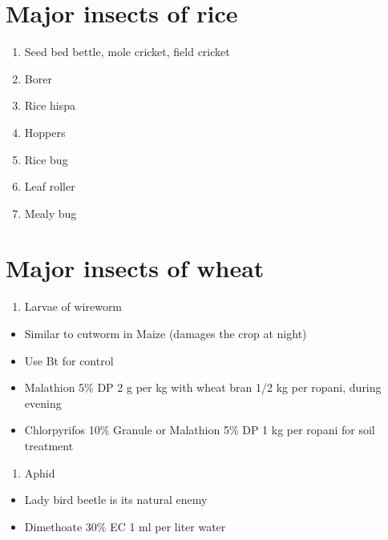 \documentclass[
]{book}
\providecommand{\tightlist}{%
  \setlength{\itemsep}{0pt}\setlength{\parskip}{0pt}}
\begin{document}
\hypertarget{major-insects-of-rice}{%
\section{Major insects of rice}\label{major-insects-of-rice}}

\begin{enumerate}
\def\labelenumi{\arabic{enumi}.}
\tightlist
\item
  Seed bed bettle, mole cricket, field cricket
\item
  Borer
\item
  Rice hispa
\item
  Hoppers
\item
  Rice bug
\item
  Leaf roller
\item
  Mealy bug
\end{enumerate}

\hypertarget{major-insects-of-wheat}{%
\section{Major insects of wheat}\label{major-insects-of-wheat}}

\begin{enumerate}
\def\labelenumi{\arabic{enumi}.}
\tightlist
\item
  Larvae of wireworm
\end{enumerate}

\begin{itemize}
\tightlist
\item
  Similar to cutworm in Maize (damages the crop at night)
\item
  Use Bt for control
\item
  Malathion 5\% DP 2 g per kg with wheat bran 1/2 kg per ropani, during evening
\item
  Chlorpyrifos 10\% Granule or Malathion 5\% DP 1 kg per ropani for soil treatment
\end{itemize}

\begin{enumerate}
\def\labelenumi{\arabic{enumi}.}
\setcounter{enumi}{1}
\tightlist
\item
  Aphid
\end{enumerate}

\begin{itemize}
\tightlist
\item
  Lady bird beetle is its natural enemy
\item
  Dimethoate 30\% EC 1 ml per liter water
\end{itemize}
\end{document}

